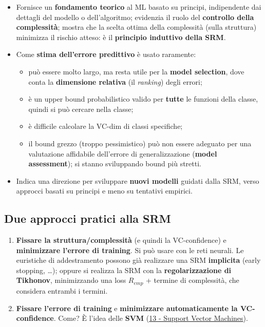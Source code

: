 \begin{itemize}
\tightlist
\item
  Fornisce un \textbf{fondamento teorico} al ML basato su principi,
  indipendente dai dettagli del modello o dell'algoritmo; evidenzia il
  ruolo del \textbf{controllo della complessità}; mostra che la scelta
  ottima della complessità (sulla struttura) minimizza il rischio
  atteso: è il \textbf{principio induttivo della SRM}.
\item
  Come \textbf{stima dell'errore predittivo} è usato raramente:

  \begin{itemize}
  \tightlist
  \item
    può essere molto largo, ma resta utile per la \textbf{model
    selection}, dove conta la \textbf{dimensione relativa} (il
    \emph{ranking}) degli errori;
  \item
    è un upper bound probabilistico valido per \textbf{tutte} le
    funzioni della classe, quindi si può cercare nella classe;
  \item
    è difficile calcolare la VC-dim di classi specifiche;
  \item
    il bound grezzo (troppo pessimistico) può non essere adeguato per
    una valutazione affidabile dell'errore di generalizzazione
    (\textbf{model assessment}); si stanno sviluppando bound più
    stretti.
  \end{itemize}
\item
  Indica una direzione per sviluppare \textbf{nuovi modelli} guidati
  dalla SRM, verso approcci basati su principi e meno su tentativi
  empirici.
\end{itemize}

\subsection{Due approcci pratici alla
SRM}\label{due-approcci-pratici-alla-srm}

\begin{enumerate}
\def\labelenumi{\arabic{enumi}.}
\tightlist
\item
  \textbf{Fissare la struttura/complessità} (e quindi la VC-confidence)
  e \textbf{minimizzare l'errore di training}. Si può usare con le reti
  neurali. Le euristiche di addestramento possono già realizzare una SRM
  \textbf{implicita} (early stopping, \ldots); oppure si realizza la SRM
  con la \textbf{regolarizzazione di Tikhonov}, minimizzando una loss
  \(R_{emp}\) + termine di complessità, che considera entrambi i
  termini.
\item
  \textbf{Fissare l'errore di training} e \textbf{minimizzare
  automaticamente la VC-confidence}. Come? È l'idea delle \textbf{SVM}
  (\href{13\%20-\%20Support\%20Vector\%20Machines}{13 - Support Vector
  Machines}).
\end{enumerate}

